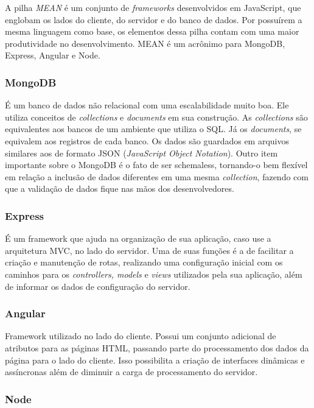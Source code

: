 \documentclass[a4paper, 12pt]{article}
\begin{document}
A pilha \textit{MEAN} é um conjunto de \textit{frameworks} desenvolvidos em JavaScript, que englobam os lados do cliente, do servidor e do banco de dados. Por possuírem a mesma linguagem como base, os elementos dessa pilha contam com uma maior produtividade no desenvolvimento. MEAN é um acrônimo para MongoDB, Express, Angular e Node.


\subsubsection{MongoDB}

É um banco de dados não relacional com uma escalabilidade muito boa. Ele utiliza conceitos de \textit{collections} e \textit{documents} em sua construção. 
As \textit{collections} são equivalentes aos bancos de um ambiente que utiliza o SQL. Já os \textit{documents}, se equivalem aos registros de cada banco.
Os dados são guardados em arquivos similares aos de formato JSON (\textit{JavaScript Object Notation}).
Outro item importante sobre o MongoDB é o fato de ser schemaless, tornando-o bem flexível em relação a inclusão de dados diferentes em uma mesma \textit{collection}, fazendo com que a validação de dados fique nas mãos dos desenvolvedores.


\subsubsection{Express}

É um framework que ajuda na organização de sua aplicação, caso use a arquitetura MVC, no lado do servidor. Uma de suas funções é a de facilitar a criação e manutenção de rotas, realizando uma configuração inicial com os caminhos para os \textit{controllers, models} e \textit{views} utilizados pela sua aplicação, além de informar os dados de configuração do servidor.


\subsubsection{Angular}

Framework utilizado no lado do cliente. Possui um conjunto adicional de atributos para as páginas HTML, passando parte do processamento dos dados da página para o lado do cliente. Isso possibilita a criação de interfaces dinâmicas e assíncronas além de diminuir a carga de processamento do servidor.


\subsubsection{Node}
\end{document}
